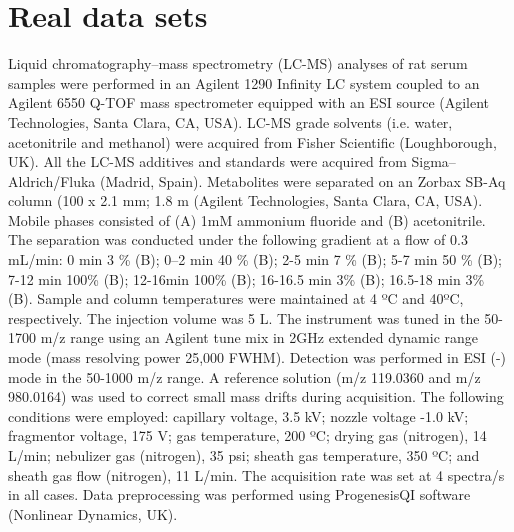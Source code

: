 \section{Real data sets}
Liquid chromatography–mass spectrometry (LC-MS) analyses of rat serum samples were performed in an Agilent 1290 Infinity LC system coupled to an Agilent 6550 Q-TOF mass spectrometer equipped with an ESI source (Agilent Technologies, Santa Clara, CA, USA). LC-MS grade solvents (i.e. water, acetonitrile and methanol) were acquired from Fisher Scientific (Loughborough, UK). All the LC-MS additives and standards were acquired from Sigma–Aldrich/Fluka (Madrid, Spain). Metabolites were separated on an Zorbax SB-Aq column (100 x 2.1 mm; 1.8 {\textmu}m (Agilent Technologies, Santa Clara, CA, USA). Mobile phases consisted of (A) 1mM ammonium fluoride and (B) acetonitrile. The separation was conducted under the following gradient at a flow of 0.3 mL/min: 0 min 3 \% (B); 0–2 min 40 \% (B); 2-5 min 7 \% (B); 5-7 min 50 \% (B); 7-12 min 100\% (B); 12-16min 100\% (B); 16-16.5 min 3\% (B); 16.5-18 min 3\% (B). Sample and column temperatures were maintained at 4 ºC and 40ºC, respectively. The injection volume was 5 {\textmu}L. 
The instrument was tuned in the 50-1700 m/z range using an Agilent tune mix in 2GHz extended dynamic range mode (mass resolving power 25,000 FWHM). Detection was performed in ESI (-) mode in the 50-1000 m/z range. A reference solution (m/z 119.0360 and m/z 980.0164) was used to correct small mass drifts during acquisition. The following conditions were employed: capillary voltage, 3.5 kV; nozzle voltage -1.0 kV; fragmentor voltage, 175 V; gas temperature, 200 ºC; drying gas (nitrogen), 14 L/min; nebulizer gas (nitrogen), 35 psi; sheath gas temperature, 350 ºC; and sheath gas flow (nitrogen), 11 L/min. The acquisition rate was set at 4 spectra/s in all cases. Data preprocessing was performed using ProgenesisQI software (Nonlinear Dynamics, UK).

